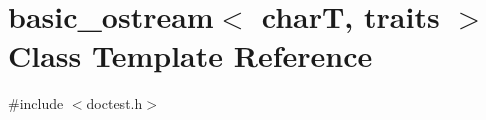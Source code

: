 \hypertarget{classbasic__ostream}{}\section{basic\+\_\+ostream$<$ charT, traits $>$ Class Template Reference}
\label{classbasic__ostream}


{\ttfamily \#include $<$doctest.\+h$>$}

